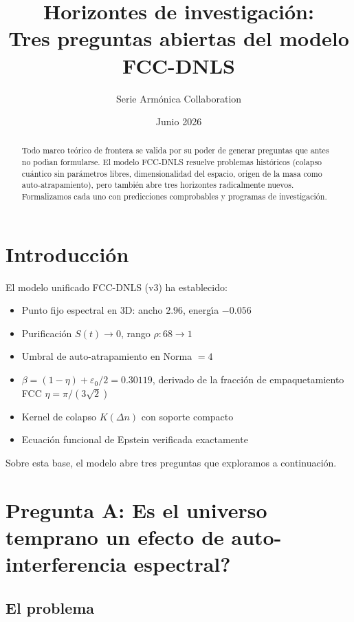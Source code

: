 \documentclass[twocolumn]{article}
\begin{document}
\title{Horizontes de investigaci\'on:\\
  Tres preguntas abiertas del modelo FCC-DNLS}
\author{Serie Arm\'onica Collaboration}
\date{Junio 2026}
\maketitle

\begin{abstract}
  Todo marco te\'orico de frontera se valida por su poder de generar
  preguntas que antes no pod\'{\i}an formularse. El modelo FCC-DNLS
  resuelve problemas hist\'oricos (colapso cu\'antico sin par\'ametros
  libres, dimensionalidad del espacio, origen de la masa como
  auto-atrapamiento), pero tambi\'en abre tres horizontes
  radicalmente nuevos. Formalizamos cada uno con predicciones
  comprobables y programas de investigaci\'on.
\end{abstract}

\section{Introducci\'on}

El modelo unificado FCC-DNLS (v3) ha establecido:
\begin{itemize}
  \item Punto fijo espectral en 3D: ancho $2.96$, energ\'{\i}a $-0.056$
  \item Purificaci\'on $S(t)\to0$, rango $\rho: 68\to1$
  \item Umbral de auto-atrapamiento en Norma $=4$
  \item $\beta = (1-\eta) + \varepsilon_0/2 = 0.30119$, derivado de la
    fracci\'on de empaquetamiento FCC $\eta = \pi/(3\sqrt2)$
  \item Kernel de colapso $K(\Delta n)$ con soporte compacto
  \item Ecuaci\'on funcional de Epstein verificada exactamente
\end{itemize}

Sobre esta base, el modelo abre tres preguntas que exploramos a
continuaci\'on.

\section{Pregunta A: \textquestiondown Es el universo temprano un
  efecto de auto-interferencia espectral?}

\subsection{El problema}
\end{document}
